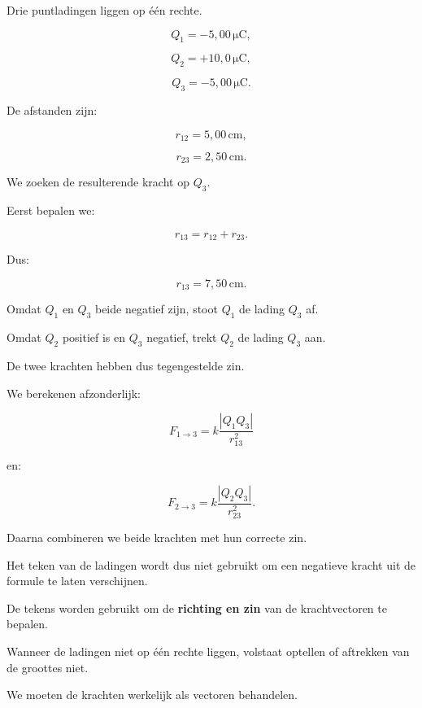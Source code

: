 \documentclass{ximera}
\begin{document}
\begin{voorbeeld}

Drie puntladingen liggen op één rechte.

\[
Q_1=-5{,}00\,\mathrm{\mu C},
\]

\[
Q_2=+10{,}0\,\mathrm{\mu C},
\]

\[
Q_3=-5{,}00\,\mathrm{\mu C}.
\]

De afstanden zijn:

\[
r_{12}=5{,}00\,\mathrm{cm},
\]

\[
r_{23}=2{,}50\,\mathrm{cm}.
\]

We zoeken de resulterende kracht op $Q_3$.

Eerst bepalen we:

\[
r_{13}=r_{12}+r_{23}.
\]

Dus:

\[
r_{13}=7{,}50\,\mathrm{cm}.
\]

Omdat $Q_1$ en $Q_3$ beide negatief zijn, stoot $Q_1$ de lading
$Q_3$ af.

Omdat $Q_2$ positief is en $Q_3$ negatief, trekt $Q_2$ de lading
$Q_3$ aan.

De twee krachten hebben dus tegengestelde zin.

We berekenen afzonderlijk:

\[
F_{1\rightarrow3}
=
k\frac{|Q_1Q_3|}{r_{13}^2}
\]

en:

\[
F_{2\rightarrow3}
=
k\frac{|Q_2Q_3|}{r_{23}^2}.
\]

Daarna combineren we beide krachten met hun correcte zin.

Het teken van de ladingen wordt dus niet gebruikt om een negatieve
kracht uit de formule te laten verschijnen.

De tekens worden gebruikt om de \textbf{richting en zin} van de
krachtvectoren te bepalen.

\end{voorbeeld}




Wanneer de ladingen niet op één rechte liggen, volstaat optellen of
aftrekken van de groottes niet.

We moeten de krachten werkelijk als vectoren behandelen.
\end{document}
